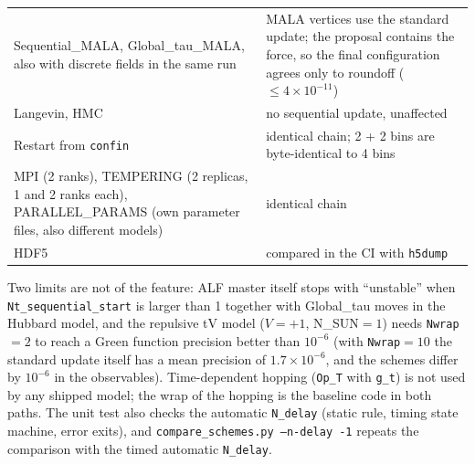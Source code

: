 \begin{center}
\begin{tabular}{p{}p{}}
Sequential\_MALA, Global\_tau\_MALA, also with discrete fields in the same run & MALA vertices use the standard
update; the proposal contains the force, so the final configuration agrees only to roundoff
($\le 4\times10^{-11}$) \\
Langevin, HMC & no sequential update, unaffected \\
Restart from \texttt{confin} & identical chain; 2 + 2 bins are byte-identical to 4 bins \\
MPI (2 ranks), TEMPERING (2 replicas, 1 and 2 ranks each), PARALLEL\_PARAMS (own parameter files, also
different models) & identical chain \\
HDF5 & compared in the CI with \texttt{h5dump} \\
\hline
\end{tabular}
\end{center}
Two limits are not of the feature: ALF master itself stops with ``unstable'' when \texttt{Nt\_sequential\_start}
is larger than 1 together with Global\_tau moves in the Hubbard model, and the repulsive tV model ($V=+1$, N\_SUN$=1$) needs
\texttt{Nwrap}$=2$ to reach a Green function precision better than $10^{-6}$ (with \texttt{Nwrap}$=10$ the standard update
itself has a mean precision of $1.7\times10^{-6}$, and the schemes differ by $10^{-6}$ in the observables).
Time-dependent hopping (\texttt{Op\_T} with \texttt{g\_t}) is not used by any shipped model; the wrap of the hopping is the baseline
code in both paths.
The unit test also checks the automatic \texttt{N\_delay} (static rule, timing state machine, error exits), and
\texttt{compare\_schemes.py --n-delay -1} repeats the comparison with the timed automatic \texttt{N\_delay}.
